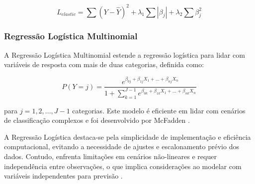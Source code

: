 \begin{equation}
L_{elastic} = \sum (Y - \hat{Y})^2 + \lambda_1\sum |\beta_j| + \lambda_2\sum \beta_j^2
\end{equation}

\subsubsection{Regressão Logística Multinomial}

A Regressão Logística Multinomial estende a regressão logística para lidar com variáveis de resposta com mais de duas categorias, definida como:

\[ P(Y=j) = \frac{e^{\beta_{0j} + \beta_{1j}X_1 + ... + \beta_{nj}X_n}}{1 + \sum_{k=1}^{J-1} e^{\beta_{0k} + \beta_{1k}X_1 + ... + \beta_{nk}X_n}} \]

para \(j = 1, 2, ..., J-1\) categorias. Este modelo é eficiente em lidar com cenários de classificação complexos e foi desenvolvido por McFadden \cite{mcfadden1973conditional}.

A Regressão Logística destaca-se pela simplicidade de implementação e eficiência computacional, evitando a necessidade de ajustes e escalonamento prévio dos dados. Contudo, enfrenta limitações em cenários não-lineares e requer independência entre observações, o que implica considerações ao modelar com variáveis independentes para previsão \cite{kowsari2019text}.






